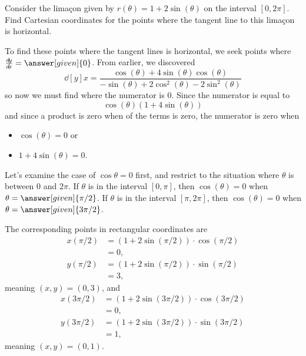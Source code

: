\documentclass{ximera}
\begin{document}
\begin{example}
  Consider the lima\c{c}on given by $r(\theta) =1+2\sin(\theta)$ on the
  interval $[0,2\pi]$.  Find Cartesian coordinates for the points
  where the tangent line to this lima\c{c}on is horizontal.
\begin{explanation}
  To find these points where the tangent lines is horizontal, we seek
  points where $\dd[y]{x} = \answer[given]{0}$.  From earlier, we discovered
  \[
  \dd[y]{x} =\frac{\cos(\theta) + 4\sin(\theta)\cos(\theta)}{-\sin(\theta) + 2\cos^2(\theta)-2\sin^2(\theta)}
  \]
  so now we must find where the numerator is $0$. Since the numerator is equal to
  \[
  \cos(\theta)(1+ 4\sin(\theta))
  \]
  and since a product is zero when  of the terms is zero,
  the numerator is zero when 
  \begin{itemize}
  \item $\cos(\theta)=0$ or
  \item $1+4\sin(\theta)=0$.
  \end{itemize}

  Let's examine the case of $\cos \theta = 0$ first, and restrict to the situation where $\theta$ is between $0$ and $2\pi$.
  If $\theta$ is in the interval $[0,\pi]$, then $\cos(\theta)=0$ when $\theta=\answer[given]{\pi/2}$.
  If $\theta$ is in the interval $[\pi,2\pi]$, then $\cos(\theta)=0$ when $\theta=\answer[given]{3\pi/2}$.

  The corresponding points in rectangular coordinates are
  \begin{align*}
    x(\pi/2) &= \left(1+2\sin(\pi/2)\right)\cdot\cos(\pi/2)\\
    &= 0,\\
    y(\pi/2) &= \left(1+2\sin(\pi/2)\right)\cdot\sin(\pi/2)\\
    &= 3,
  \end{align*}
  meaning $(x,y) = (0,3)$, and
  \begin{align*}
    x(3\pi/2) &= \left(1+2\sin(3\pi/2)\right)\cdot\cos(3\pi/2)\\
    &= 0,\\
    y(3\pi/2) &= \left(1+2\sin(3\pi/2)\right)\cdot\sin(3\pi/2)\\
    &= 1,
  \end{align*}
  meaning $(x,y) = (0,1)$.


\end{explanation}
\end{example}
\end{document}
